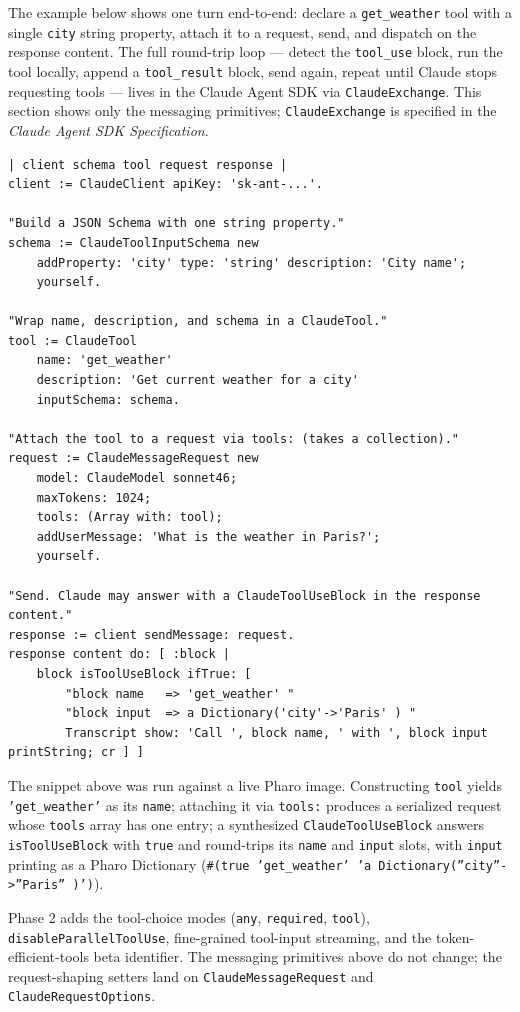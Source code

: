 \documentclass[a4paper,10pt,fleqn]{article}
\begin{document}
The example below shows one turn end-to-end: declare a
\texttt{get\_weather} tool with a single \texttt{city} string
property, attach it to a request, send, and dispatch on the
response content.  The full round-trip loop --- detect the
\texttt{tool\_use} block, run the tool locally, append a
\texttt{tool\_result} block, send again, repeat until Claude stops
requesting tools --- lives in the Claude Agent SDK via
\texttt{ClaudeExchange}.  This section shows only the messaging
primitives; \texttt{ClaudeExchange} is specified in the
\emph{Claude Agent SDK Specification}.

\begin{lstlisting}[language={}]
| client schema tool request response |
client := ClaudeClient apiKey: 'sk-ant-...'.

"Build a JSON Schema with one string property."
schema := ClaudeToolInputSchema new
    addProperty: 'city' type: 'string' description: 'City name';
    yourself.

"Wrap name, description, and schema in a ClaudeTool."
tool := ClaudeTool
    name: 'get_weather'
    description: 'Get current weather for a city'
    inputSchema: schema.

"Attach the tool to a request via tools: (takes a collection)."
request := ClaudeMessageRequest new
    model: ClaudeModel sonnet46;
    maxTokens: 1024;
    tools: (Array with: tool);
    addUserMessage: 'What is the weather in Paris?';
    yourself.

"Send. Claude may answer with a ClaudeToolUseBlock in the response content."
response := client sendMessage: request.
response content do: [ :block |
    block isToolUseBlock ifTrue: [
        "block name   => 'get_weather' "
        "block input  => a Dictionary('city'->'Paris' ) "
        Transcript show: 'Call ', block name, ' with ', block input printString; cr ] ]
\end{lstlisting}

The snippet above was run against a live Pharo image.  Constructing
\texttt{tool} yields \texttt{'get\_weather'} as its \texttt{name};
attaching it via \texttt{tools:} produces a serialized request
whose \texttt{tools} array has one entry; a synthesized
\texttt{ClaudeToolUseBlock} answers \texttt{isToolUseBlock} with
\texttt{true} and round-trips its \texttt{name} and \texttt{input}
slots, with \texttt{input} printing as a Pharo Dictionary
(\texttt{\#(true 'get\_weather' 'a Dictionary(''city''->''Paris'' )')}).

Phase 2 adds the tool-choice modes (\texttt{any},
\texttt{required}, \texttt{tool}),
\texttt{disableParallelToolUse}, fine-grained tool-input
streaming, and the token-efficient-tools beta identifier.  The
messaging primitives above do not change; the request-shaping
setters land on \texttt{ClaudeMessageRequest} and
\texttt{ClaudeRequestOptions}.
\end{document}
